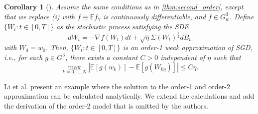 \documentclass[12pt]{article}
\newtheorem{lemma}[lemma]{Lemma}
\newtheorem{corollary}[theorem]{Corollary}
\theoremstyle{definition}
\numberwithin{equation}{section}
\newcommand{\R}{\mathbb{R}}
\newcommand{\E}{\mathbb{E}}
\newcommand{\T}{\mathsf{T}}
\newcommand{\ev}[1]{\mathbb{E}\left[{#1}\right]}
\DeclareMathOperator{\diag}{diag}
\begin{document}
\begin{corollary}[]
  \label{cor:first_order}
  Assume the same conditions as in \autoref{thm:second_order}, except that we replace (i) with $f \equiv \E f_{\gamma}$ is continuously differentiable, and $f \in G^3_w$.
  Define $\{W_t:t\in [0,T] \}$ as the stochastic process satisfying the SDE
  \begin{equation}
    \label{eq:first_order_sde}
    d W_t = -\nabla f(W_t) dt + \sqrt{\eta}\Sigma(W_t)^{\frac{1}{2}}dB_t
  \end{equation}
  with $W_0 = w_0$. Then, $\{W_t:t\in [0,T] \}$ is an order-1 weak approximation of SGD, i.e., for each $g \in G^3$, there exists a constant $C > 0$ independent of $\eta$ such that
  \begin{equation}
    \label{eq:first_order_convergence}
    \max_{k=0,\dots,N} |\ev{g(w_k)} - \ev{g(W_{k\eta})}| \leq C \eta.
  \end{equation}
\end{corollary}
Li et al. \cite{liStochasticModifiedEquations2019} present an example where the solution to the order-1 and order-2 approximation can be calculated analytically. We extend the calculations and add the derivation of the order-2 model that is omitted by the authors.
  
\end{document}
